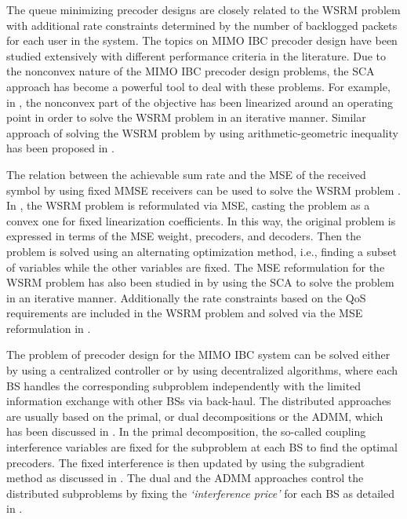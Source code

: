 The queue minimizing precoder designs are closely related to the \ac{WSRM} problem with additional rate constraints determined by the number of backlogged packets for each user in the system. The topics on \ac{MIMO} \ac{IBC} precoder design have been studied extensively with different performance criteria in the literature. Due to the nonconvex nature of the \ac{MIMO} \ac{IBC} precoder design problems, the \ac{SCA} approach has become a powerful tool to deal with these problems. For example, in \cite{sin_algorithm}, the nonconvex part of the objective has been linearized around an operating point in order to solve the \ac{WSRM} problem in an iterative manner. Similar approach of solving the \ac{WSRM} problem by using arithmetic-geometric inequality has been proposed in \cite{tran2012fast}.

The relation between the achievable sum rate and the \ac{MSE} of the received symbol by using fixed \ac{MMSE} receivers can be used to solve the \ac{WSRM} problem \cite{mse_duality}. In \cite{christensen2008weighted,wmmse_shi}, the \ac{WSRM} problem is reformulated via \ac{MSE}, casting the problem as a convex one for fixed linearization coefficients. In this way, the original problem is expressed in terms of the \ac{MSE} weight, precoders, and decoders. Then the problem is solved using an alternating optimization method, i.e., finding a subset of variables while the other variables are fixed. The \ac{MSE} reformulation for the \ac{WSRM} problem has also been studied in \cite{hong2012decomposition} by using the \ac{SCA} to solve the problem in an iterative manner. Additionally the rate constraints based on the \ac{QoS} requirements are included in the \ac{WSRM} problem and solved via the \ac{MSE} reformulation in \cite{kaleva2013primal,kaleva2013decentralized}.

The problem of precoder design for the \ac{MIMO} \ac{IBC} system can be solved either by using a centralized controller or by using decentralized algorithms, where each \ac{BS} handles the corresponding subproblem independently with the limited information exchange with other \acp{BS} via back-haul. The distributed approaches are usually based on the primal, or dual decompositions or the \ac{ADMM}, which has been discussed in \cite{palomar2006tutorial,boyd2011distributed}. In the  primal decomposition, the so-called coupling interference variables are fixed for the subproblem at each \ac{BS} to find the optimal precoders. The fixed interference is then updated by using the subgradient method as discussed in \cite{pennanen2011decentralized}. The dual and the \ac{ADMM} approaches control the distributed subproblems by fixing the \emph{`interference price'} for each \ac{BS} as detailed in \cite{tolli2011decentralized}.

